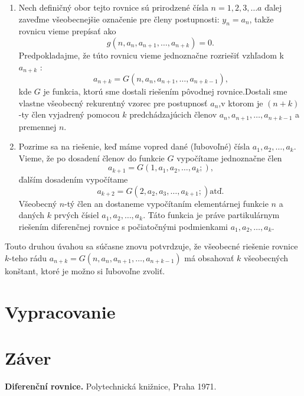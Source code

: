 \documentclass[a4paper,10pt]{article}
\theoremstyle{plain}
\theoremstyle{definition}
\begin{document}
\begin{enumerate}
	\item Nech definičný obor tejto rovnice sú prirodzené čísla $ n = 1, 2, 3, \ldots a$
		ďalej zaveďme všeobecnejšie označenie pre členy postupnosti: $ y_{n} =  a_{n}$,
		takže rovnicu vieme prepísať ako  $$g(n, a_{n}, a_{n+1}, \ldots, a_{n+k}) = 0\text{.}$$
		Predpokladajme, že túto rovnicu vieme jednoznačne rozriešiť vzhľadom k $ a_{n+k}$ :
		$$a_{n+k} = G(n, a_{n}, a_{n+1}, \ldots, a_{n+k-1})\text{,}$$
		kde $G$ je funkcia, ktorú sme dostali riešením pôvodnej rovnice.\linebreak[4]
		 Dostali sme vlastne všeobecný rekurentný vzorec pre postupnosť $a_{n}$,\linebreak[4] v ktorom je $(n+k)$-ty 				člen vyjadrený pomocou $k$ predchádzajúcich členov 
		$a_{n}, a_{n+1}, \ldots, a_{n+k-1}$ a premennej $n$.
	\item Pozrime sa na riešenie, keď máme vopred dané (ľubovoľné) čísla $ a_{1}, a_{2}, \ldots, a_{k}$.
		Vieme, že po dosadení členov do funkcie $G$ vypočítame jednoznačne člen
		$$a_{k+1} = G(1, a_{1}, a_{2}, \ldots, a_{k};)\text{,}$$ ďalším dosadením vypočítame
		$$a_{k+2} = G(2, a_{2}, a_{3}, \ldots, a_{k+1};)\text{atď.}$$
		Všeobecný $n$-tý člen an dostaneme vypočítaním elementárnej funkcie
		$n$ a daných $k$ prvých čísiel $ a_{1}, a_{2}, \ldots, a_{k}$. Táto funkcia je práve partikulárnym riešením 				diferenčnej rovnice s počiatočnými podmienkami $ a_{1}, a_{2}, \ldots, a_{k}$.	
\end{enumerate}

Touto druhou úvahou sa súčasne znovu potvrdzuje, že všeobecné riešenie rovnice $k$-teho rádu 
$a_{n+k} = G(n, a_{n}, a_{n+1}, \ldots, a_{n+k-1})$ má obsahovať
$k$ všeobecných konštant, ktoré je možno si ľubovoľne zvoliť.


\section{Vypracovanie}

\newpage
\section{Záver}


\begin{thebibliography}{9}
               {\bf Diferenční rovnice.}
           Polytechnická knižnice, Praha 1971.
\end{thebibliography}
\end{document}
